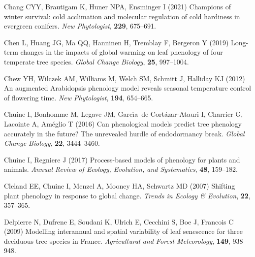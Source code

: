 \documentclass[11pt,letter]{article}
\begin{document}
\begin{thebibliography}{63}
Chang CYY, Brautigam K, Huner NPA, Ensminger I (2021) Champions of winter
  survival: cold acclimation and molecular regulation of cold hardiness in
  evergreen conifers.
\newblock \emph{New Phytologist}, \textbf{229}, 675--691.

Chen L, Huang JG, Ma QQ, Hanninen H, Tremblay F, Bergeron Y (2019) Long-term
  changes in the impacts of global warming on leaf phenology of four temperate
  tree species.
\newblock \emph{Global Change Biology}, \textbf{25}, 997--1004.

Chew YH, Wilczek AM, Williams M, Welch SM, Schmitt J, Halliday KJ (2012) {An
  augmented Arabidopsis phenology model reveals seasonal temperature control of
  flowering time}.
\newblock \emph{New Phytologist}, \textbf{194}, 654--665.

Chuine I, Bonhomme M, Legave JM, Garc{\'\i}a~de Cort{\'a}zar-Atauri I, Charrier
  G, Lacointe A, Am{\'e}glio T (2016) Can phenological models predict tree
  phenology accurately in the future? {T}he unrevealed hurdle of endodormancy
  break.
\newblock \emph{Global Change Biology}, \textbf{22}, 3444--3460.

Chuine I, Regniere J (2017) Process-based models of phenology for plants and
  animals.
\newblock \emph{Annual Review of Ecology, Evolution, and Systematics},
  \textbf{48}, 159--182.

Cleland EE, Chuine I, Menzel A, Mooney HA, Schwartz MD (2007) Shifting plant
  phenology in response to global change.
\newblock \emph{Trends in Ecology \& Evolution}, \textbf{22}, 357--365.

Delpierre N, Dufrene E, Soudani K, Ulrich E, Cecchini S, Boe J, Francois C
  (2009) {Modelling interannual and spatial variability of leaf senescence for
  three deciduous tree species in France}.
\newblock \emph{Agricultural and Forest Meteorology}, \textbf{149}, 938--948.


\end{thebibliography}
\end{document}
